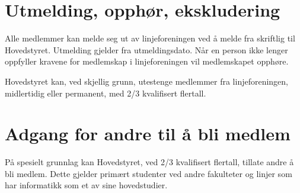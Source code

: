 \section{Utmelding, opphør, ekskludering}
\vspace{23pt}
Alle medlemmer kan melde seg ut av linjeforeningen ved å melde fra skriftlig til Hovedstyret. Utmelding gjelder fra utmeldingsdato. Når en person ikke lenger oppfyller kravene for medlemskap i linjeforeningen vil medlemskapet opphøre.

Hovedstyret kan, ved skjellig grunn, utestenge medlemmer fra linjeforeningen, midlertidig eller permanent, med 2/3 kvalifisert flertall.


\section{Adgang for andre til å bli medlem}
\vspace{23pt}
På spesielt grunnlag kan Hovedstyret, ved 2/3 kvalifisert flertall, tillate andre å bli medlem. Dette gjelder primært studenter ved andre fakulteter og linjer som har informatikk som et av sine hovedstudier.
